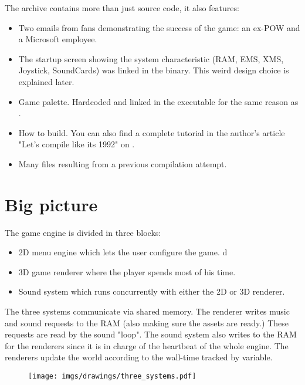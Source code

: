 \documentclass[book.tex]{subfiles}
\begin{document}
The archive contains more than just source code, it also features:
\begin{itemize}
\item {} Two emails from fans demonstrating the success of the game: an ex-POW and a Microsoft employee.
\item {} The startup screen showing the system characteristic (RAM, EMS, XMS, Joystick, SoundCards) was linked in the binary. This weird design choice is explained later.
\item {} Game palette. Hardcoded and linked in the executable for the same reason as .
\item {} How to build. You can also find a complete tutorial in the author's article "Let's compile like its 1992" on .
\item Many files resulting from a previous compilation attempt.
\end{itemize}







\section{Big picture}
The game engine is divided in three blocks:
\begin{itemize}
\item 2D menu engine which lets the user configure the game.
d\item 3D game renderer where the player spends most of his time.
\item Sound system which runs concurrently with either the 2D or 3D renderer. 
\end{itemize}
The three systems communicate via shared memory. The renderer writes music and sound requests to the RAM (also making sure the assets are ready.) These requests are read by the sound "loop". The sound system also writes to the RAM for the renderers since it is in charge of the heartbeat of the whole engine. The renderers update the world according to the wall-time tracked by  variable.
\par
\begin{figure}[H]
\centering
 \texttt{[image: imgs/drawings/three\_systems.pdf]}
 \end{figure}
 \par

 
\end{document}
